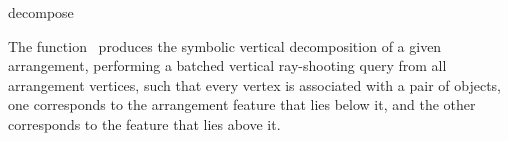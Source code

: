 \ccRefPageBegin

\begin{ccRefFunction}{decompose}

\ccDefinition

The function \ccRefName\ produces the symbolic vertical decomposition of a
given arrangement, performing a batched vertical ray-shooting query from
all arrangement vertices, such that every vertex is associated with a pair
of objects, one corresponds to the arrangement feature that lies below it,
and the other corresponds to the feature that lies above it.




\end{ccRefFunction}
